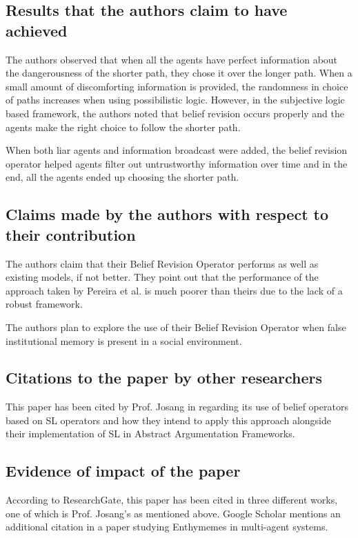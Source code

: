 \documentclass[UTF8]{article}
\begin{document}
\subsection{Results that the authors claim to have achieved}
The authors observed that when all the agents have perfect information about the dangerousness of the shorter path, 
they chose it over the longer path. When a small amount of discomforting information is provided, the randomness in choice
of paths increases when using possibilistic logic. However, in the subjective logic based framework, the authors noted that 
belief revision occurs properly and the agents make the right choice to follow the shorter path. 

When both liar agents and information broadcast were added, the belief revision operator helped 
agents filter out untrustworthy information over time and in the end, all the agents ended up choosing the shorter path.

\subsection{Claims made by the authors with respect to their contribution}
The authors claim that their Belief Revision Operator performs as well as existing models, if not better.
They point out that the performance of the approach taken by Pereira et al. is much poorer than theirs due to the lack of a robust framework.

The authors plan to explore the use of their Belief Revision Operator when false institutional memory is present in a social environment.  

\subsection{Citations to the paper by other researchers}
This paper has been cited by Prof. Josang in \cite{8455455} regarding its use of belief operators based on SL operators and how they intend to apply this approach alongside their implementation of SL in Abstract Argumentation Frameworks.

\subsection{Evidence of impact of the paper}
According to ResearchGate, this paper has been cited in three different works, one of which is Prof. Josang's \cite{8455455} as mentioned above. Google Scholar mentions an additional citation in a paper studying Enthymemes in multi-agent systems.
\end{document}
